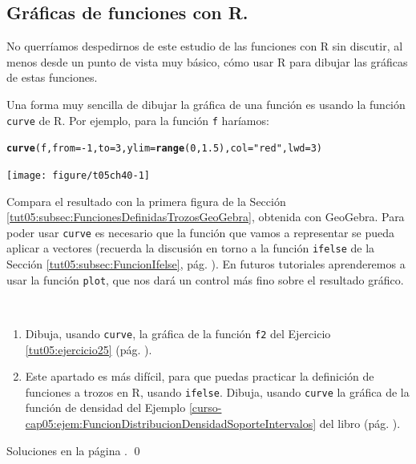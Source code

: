 \documentclass[10pt,a4paper]{article}\usepackage[]{graphicx}\usepackage[]{color}
\makeatletter
\newcommand{\hlnum}[1]{\textcolor[rgb]{0.686,0.059,0.569}{#1}}%
\newcommand{\hlstr}[1]{\textcolor[rgb]{0.192,0.494,0.8}{#1}}%
\newcommand{\hlopt}[1]{\textcolor[rgb]{0,0,0}{#1}}%
\newcommand{\hlstd}[1]{\textcolor[rgb]{0.345,0.345,0.345}{#1}}%
\newcommand{\hlkwc}[1]{\textcolor[rgb]{0.333,0.667,0.333}{#1}}%
\newcommand{\hlkwd}[1]{\textcolor[rgb]{0.737,0.353,0.396}{\textbf{#1}}}%
\newenvironment{kframe}{%
 \def\at@end@of@kframe{}%
 \ifinner\ifhmode%
  \def\at@end@of@kframe{\end{minipage}}%
  \begin{minipage}{\columnwidth}%
 \fi\fi%
 \def\FrameCommand##1{\hskip\@totalleftmargin \hskip-\fboxsep
 \colorbox{shadecolor}{##1}\hskip-\fboxsep
     \hskip-\linewidth \hskip-\@totalleftmargin \hskip\columnwidth}%
 \MakeFramed {\advance\hsize-\width
   \@totalleftmargin\z@ \linewidth\hsize
   \@setminipage}}%
 {\par\unskip\endMakeFramed%
 \at@end@of@kframe}
\newenvironment{knitrout}{}{} %
\newcounter{cont01}
\makeatother
\begin{document}
\subsection{Gráficas de funciones con R.}
\label{tut05:subsec:GraficasFuncionesConR}

No querríamos despedirnos de este estudio de las funciones con R sin discutir, al menos desde un punto de vista muy básico, cómo usar R para dibujar las gráficas de estas funciones.

Una forma muy sencilla de dibujar la gráfica de una función es usando la función {\tt curve} de R. Por ejemplo, para la función {\tt f} haríamos:
\begin{knitrout}
\color{fgcolor}\begin{kframe}
\begin{alltt}
\hlkwd{curve}\hlstd{(f,} \hlkwc{from}\hlstd{=}\hlopt{-}\hlnum{1}\hlstd{,} \hlkwc{to}\hlstd{=}\hlnum{3}\hlstd{,} \hlkwc{ylim}\hlstd{=}\hlkwd{range}\hlstd{(}\hlnum{0}\hlstd{,} \hlnum{1.5}\hlstd{),} \hlkwc{col}\hlstd{=}\hlstr{"red"}\hlstd{,} \hlkwc{lwd}\hlstd{=}\hlnum{3}\hlstd{)}
\end{alltt}
\end{kframe}
\texttt{[image: figure/t05ch40-1]} 

\end{knitrout}
Compara el resultado con la primera figura de la Sección \ref{tut05:subsec:FuncionesDefinidasTrozosGeoGebra}, obtenida con GeoGebra. Para poder usar {\tt curve} es necesario que la función que vamos a representar se pueda aplicar a vectores (recuerda la discusión en torno a la función {\tt ifelse} de la Sección \ref{tut05:subsec:FuncionIfelse}, pág. \pageref{tut05:subsec:FuncionIfelse}). En futuros tutoriales aprenderemos a usar la función {\tt plot}, que nos dará un control más fino sobre el resultado gráfico.

\begin{ejercicio}
\label{tut05:ejercicio29}
\quad\\
\begin{enumerate}
  \item Dibuja, usando {\tt curve}, la gráfica de la función {\tt f2} del Ejercicio \ref{tut05:ejercicio25} (pág. \pageref{tut05:ejercicio25}).

  \item Este apartado es más difícil, para que puedas practicar la definición de funciones a trozos en R, usando {\tt ifelse}. Dibuja, usando {\tt curve} la gráfica de la función de densidad del Ejemplo \ref{curso-cap05:ejem:FuncionDistribucionDensidadSoporteIntervalos} del libro (pág. \pageref{curso-cap05:ejem:FuncionDistribucionDensidadSoporteIntervalos}).
\end{enumerate}
Soluciones en la página \pageref{tut05:ejercicio29:sol}.
\qed
\end{ejercicio}
\end{document}
